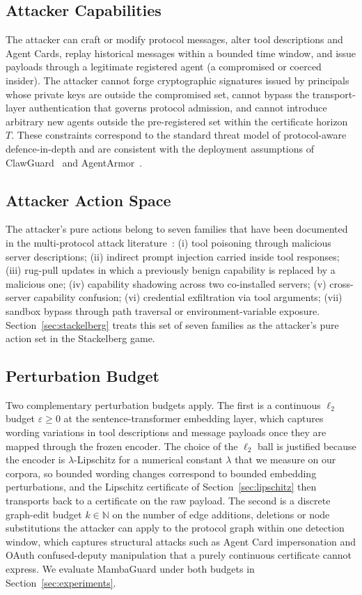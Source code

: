 \documentclass{ieeeaccess}
\begin{document}
\subsection{Attacker Capabilities}
The attacker can craft or modify protocol messages, alter tool descriptions and Agent Cards, replay historical messages within a bounded time window, and issue payloads through a legitimate registered agent (a compromised or coerced insider). The attacker cannot forge cryptographic signatures issued by principals whose private keys are outside the compromised set, cannot bypass the transport-layer authentication that governs protocol admission, and cannot introduce arbitrary new agents outside the pre-registered set within the certificate horizon $T$. These constraints correspond to the standard threat model of protocol-aware defence-in-depth and are consistent with the deployment assumptions of ClawGuard~\cite{Zhao2026ClawGuard} and AgentArmor~\cite{Wang2025AgentArmor}.

\subsection{Attacker Action Space}
The attacker's pure actions belong to seven families that have been documented in the multi-protocol attack literature~\cite{Hou2025MCP,Yang2025MCPSec,Habler2025A2A}: (i) tool poisoning through malicious server descriptions; (ii) indirect prompt injection carried inside tool responses; (iii) rug-pull updates in which a previously benign capability is replaced by a malicious one; (iv) capability shadowing across two co-installed servers; (v) cross-server capability confusion; (vi) credential exfiltration via tool arguments; (vii) sandbox bypass through path traversal or environment-variable exposure. Section~\ref{sec:stackelberg} treats this set of seven families as the attacker's pure action set in the Stackelberg game.

\subsection{Perturbation Budget}
Two complementary perturbation budgets apply. The first is a continuous $\ell_{2}$ budget $\varepsilon\ge 0$ at the sentence-transformer embedding layer, which captures wording variations in tool descriptions and message payloads once they are mapped through the frozen encoder. The choice of the $\ell_{2}$ ball is justified because the encoder is $\lambda$-Lipschitz for a numerical constant $\lambda$ that we measure on our corpora, so bounded wording changes correspond to bounded embedding perturbations, and the Lipschitz certificate of Section~\ref{sec:lipschitz} then transports back to a certificate on the raw payload. The second is a discrete graph-edit budget $k\in\mathbb{N}$ on the number of edge additions, deletions or node substitutions the attacker can apply to the protocol graph within one detection window, which captures structural attacks such as Agent Card impersonation and OAuth confused-deputy manipulation that a purely continuous certificate cannot express. We evaluate MambaGuard under both budgets in Section~\ref{sec:experiments}.
\end{document}
